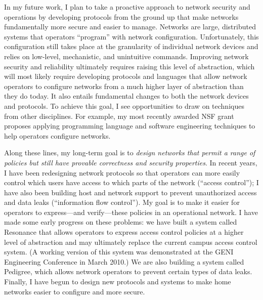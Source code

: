 In my future work, I plan to take a proactive approach to network
security and operations by developing protocols from the ground up that
make networks fundamentally more secure and easier to manage.  Networks
are large, distributed systems that operators ``program'' with network
configuration.  Unfortunately, this configuration still takes place at
the granularity of individual network devices and relies on low-level,
mechanistic, and unintuitive commands.  Improving network security and
reliability ultimately requires raising this level of abstraction, which
will most likely require developing protocols and languages that allow
network operators to configure networks from a much higher layer of
abstraction than they do today.  It also entails fundamental changes to
both the network devices and protocols.  To achieve this goal, I see
opportunities to draw on techniques from other disciplines.  For
example, my most recently awarded NSF grant proposes applying
programming language and software engineering techniques to help
operators configure networks.

Along these lines, my long-term goal is to {\em design networks that
permit a range of policies but still have provable correctness and
security properties}.  In recent years, I have been redesigning network
protocols so that operators can more easily control which users have
access to which parts of the network (``access control''); I have also
been building host and network support to prevent unauthorized access
and data leaks (``information flow control'').  My goal is to make it
easier for operators to express---and verify---these policies in an
operational network.  I have made some early progress on these problems:
we have built a system called Resonance that allows operators to express
access control policies at a higher level of abstraction and may
ultimately replace the current campus access control system. (A working
version of this system was demonstrated at the GENI Engineering
Conference in March 2010.)  We are also building a system called
Pedigree, which allows network operators to prevent certain types of
data leaks.  Finally, I have begun to design new protocols and systems
to make home networks easier to configure and more secure.  

